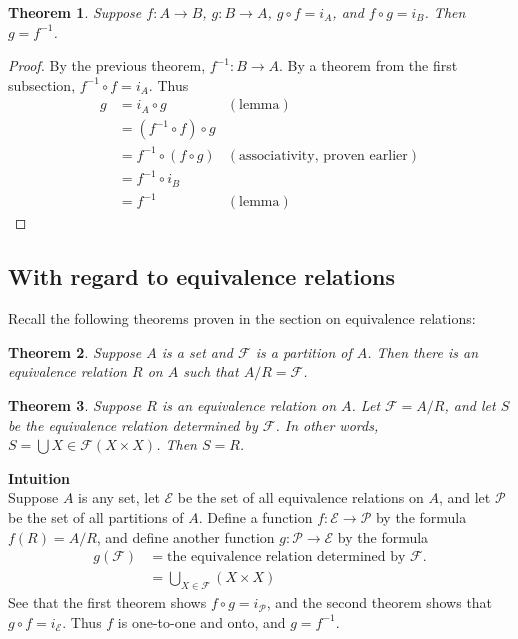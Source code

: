 \documentclass{report}
\newtheorem*{theorem}{Theorem}
\theoremstyle{definition}
\begin{document}
\begin{theorem}
Suppose $f:A\to B$, $g:B\to A$, $g\circ f=i_A$, and $f\circ g=i_B$. Then $g=f^{-1}$.
\end{theorem}
\begin{proof}
By the previous theorem, $f^{-1}:B\to A$. By a theorem from the first subsection, $f^{-1}\circ f=i_A$. Thus
\begin{align*}
g&=i_A\circ g&(\text{lemma})\\
&=(f^{-1}\circ f)\circ g&\\
&=f^{-1}\circ(f\circ g)&(\text{associativity, proven earlier})\\
&=f^{-1}\circ i_B&\\
&=f^{-1}&(\text{lemma})
\end{align*}
\end{proof}
\newpage

\subsection{With regard to equivalence relations}
Recall the following theorems proven in the section on equivalence relations:
\begin{theorem}
Suppose $A$ is a set and $\mathcal F$ is a partition of $A$. Then there is an equivalence relation $R$ on $A$ such that $A/R=\mathcal F$.
\end{theorem}
\begin{theorem}
Suppose $R$ is an equivalence relation on $A$. Let $\mathcal F=A/R$, and let $S$ be the equivalence relation determined by $\mathcal F$. In other words, $S=\bigcup X\in\mathcal F(X\times X)$. 
Then $S=R$.
\end{theorem}
\noindent\textbf{Intuition}\\
Suppose $A$ is any set, let $\mathcal E$ be the set of all equivalence relations on $A$, and let $\mathcal P$ be the set of all partitions of $A$. Define a function $f:\mathcal E\to\mathcal P$
by the formula $f(R)=A/R$, and define another function $g:\mathcal P\to\mathcal E$ by the formula
\begin{align*}
g(\mathcal F)&=\text{the equivalence relation determined by $\mathcal F$.}\\
&=\bigcup_{X\in\mathcal F}(X\times X)
\end{align*}
See that the first theorem shows $f\circ g=i_{\mathcal P}$, and the second theorem shows that
$g\circ f=i_{\mathcal E}$. Thus $f$ is one-to-one and onto, and $g=f^{-1}$.
\newpage
\end{document}
